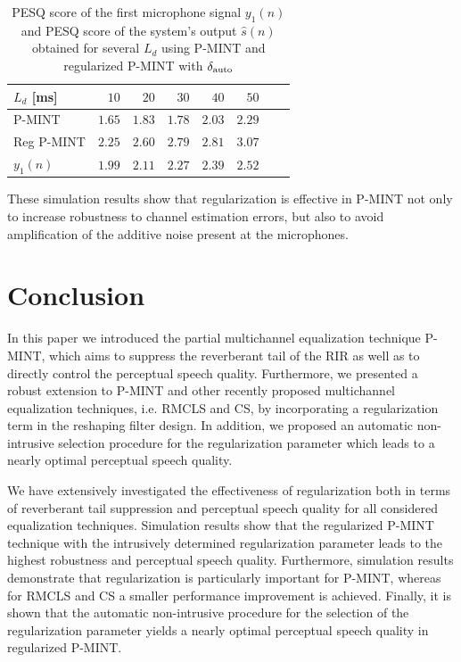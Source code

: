 \documentclass[10pt]{IEEEtran}
\begin{document}
\begin{table}[t!]
\centering
\caption{PESQ score of the first microphone signal $y_1(n)$ and PESQ score of the system's output $\hat{s}(n)$ obtained for several $L_d$ using P-MINT and regularized P-MINT with $\delta_{\rm auto}$}
\label{tbl: pesq}
\begin{tabular}{|l|r|r|r|r|r|r|r|}
\hline
$L_d$ [ms] & $10$ & $20$ & $30$ & $40$ & $50$ \\
\hline
P-MINT & $1.65$ & $1.83$ & $1.78$ & $2.03$ & $2.29$  \\
\hline
Reg P-MINT & $2.25$ & $2.60$ & $2.79$ & $2.81$ & $3.07$  \\
\hline
$y_1(n)$ & $1.99$ & $2.11$ & $2.27$ & $2.39$ & $2.52$  \\
\hline
\end{tabular}

\end{table}

These simulation results show that regularization is effective in P-MINT not only to increase robustness to channel estimation errors, but also to avoid amplification of the additive noise present at the microphones. 
\section{Conclusion}
In this paper we introduced the partial multichannel equalization technique P-MINT, which aims to suppress the reverberant tail of the RIR as well as to directly control the perceptual speech quality.
Furthermore, we presented a robust extension to P-MINT and other recently proposed multichannel equalization techniques, i.e. RMCLS and CS, by incorporating a regularization term in the reshaping filter design.
In addition, we proposed an automatic non-intrusive selection procedure for the regularization parameter which leads to a nearly optimal perceptual speech quality.

We have extensively investigated the effectiveness of regularization both in terms of reverberant tail suppression and perceptual speech quality for all considered equalization techniques.
Simulation results show that the regularized P-MINT technique with the intrusively determined regularization parameter leads to the highest robustness and perceptual speech quality.
Furthermore, simulation results demonstrate that regularization is particularly important for P-MINT, whereas for RMCLS and CS a smaller performance improvement is achieved.
Finally, it is shown that the automatic non-intrusive procedure for the selection of the regularization parameter yields a nearly optimal perceptual speech quality in regularized P-MINT.
\end{document}
